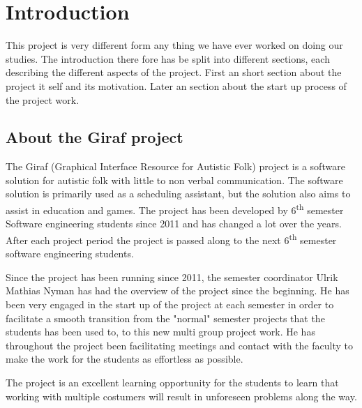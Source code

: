 \chapter{Introduction}
This project is very different form any thing we have ever worked on doing our studies. 
The introduction there fore has be split into different sections, each describing the different aspects of the project. 
First an short section about the project it self and its motivation. 
Later an section about the start up process of the project work. 

\section{About the Giraf project}
The Giraf (Graphical Interface Resource for Autistic Folk) project is a software solution for autistic folk with little to non verbal communication.
The software solution is primarily used as a scheduling assistant, but the solution also aims to assist in education and games. 
The project has been developed by 6\textsuperscript{th} semester Software engineering students since 2011 and has changed a lot over the years. 
After each project period the project is passed along to the next 6\textsuperscript{th} semester software engineering students.

Since the project has been running since 2011, the semester coordinator Ulrik Mathias Nyman  has had the overview of the project since the beginning. 
He has been very engaged in the start up of the project at each semester in order to facilitate a smooth transition from the "normal" semester projects that the students has been used to, to this new multi group project work. 
He has throughout the project been facilitating meetings and contact with the faculty to make the work for the students as effortless as possible.

The project is an excellent learning opportunity for the students to learn that working with multiple costumers will result in unforeseen problems along the way.

